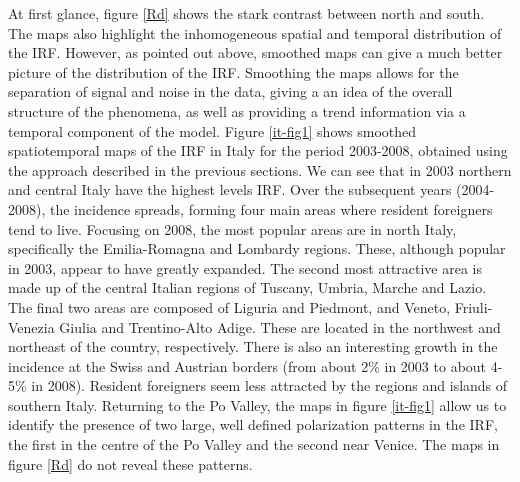 At first glance, figure \ref{Rd} shows the stark contrast between north and south. The maps also highlight the inhomogeneous spatial and temporal distribution of the IRF. However, as pointed out above, smoothed maps can give a much better picture of the distribution of the IRF. Smoothing the maps allows for the separation of signal and noise in the data, giving a an idea of the overall structure of the phenomena, as well as providing a trend information via a temporal component of the model. Figure \ref{it-fig1} shows smoothed spatiotemporal maps of the IRF in Italy for the period 2003-2008, obtained using the approach described in the previous sections. We can see that in 2003 northern and central Italy have the highest levels IRF. Over the subsequent years (2004-2008), the incidence spreads, forming four main areas where resident foreigners tend to live. Focusing on 2008, the most popular areas are in north Italy, specifically the Emilia-Romagna and Lombardy regions. These, although popular in 2003, appear to have greatly expanded. The second most attractive area is made up of the central Italian regions of Tuscany, Umbria, Marche and Lazio. The final two areas are composed of Liguria and Piedmont, and Veneto, Friuli-Venezia Giulia and Trentino-Alto Adige. These are located in the northwest and northeast of the country, respectively. There is also an interesting growth in the incidence at the Swiss and Austrian borders (from about 2\% in 2003 to about 4-5\% in 2008). Resident foreigners seem less attracted by the regions and islands of southern Italy. Returning to the Po Valley, the maps in figure \ref{it-fig1} allow us to identify the presence of two large, well defined polarization patterns in the IRF, the first in the centre of the Po Valley and the second near Venice. The maps in figure \ref{Rd} do not reveal these patterns.

